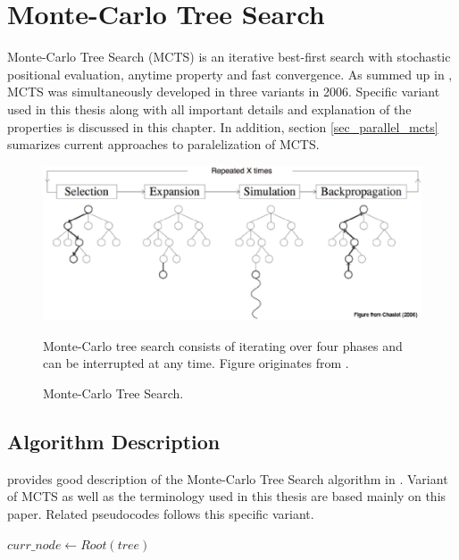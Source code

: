 \chapter{Monte-Carlo Tree Search}
\label{chap_mcts}

Monte-Carlo Tree Search (MCTS) is an iterative best-first search with stochastic positional
evaluation, anytime property and fast convergence. As \citeauthor{ChaslotPhd2010} summed up in 
\cite{ChaslotPhd2010}, MCTS was simultaneously developed
in three variants \cites{Chaslot2006}{Coulom2006}{Kocsis2006} in 2006. Specific variant used in
this thesis along with all important details and explanation of the properties is discussed in this
chapter. In addition, section \ref{sec_parallel_mcts} sumarizes current approaches to paralelization
of MCTS.

\begin{figure}
\begin{center}
\includegraphics[width=14cm]{img/mcts-algorithm-1a.eps}
\end{center}
\caption{\footnotesize Monte-Carlo Tree Search.}{\footnotesize Monte-Carlo tree search consists
of iterating over four phases and can be interrupted at any time. Figure originates from
\cite{ChaslotPhd2010}.}
\label{fig_mcts_loop}
\end{figure}



\section{Algorithm Description}
\label{sec_mcts_description}

\citeauthor{Chaslot2008} provides good description of the Monte-Carlo Tree Search algorithm in
\cite{Chaslot2008}. Variant of MCTS as well as the terminology used in this thesis are based mainly
on this paper. Related pseudocodes follows this specific variant.


\begin{algorithm}
\DontPrintSemicolon
\caption{$Select(tree)$     \label{alg_select}}
$curr\_node \leftarrow Root(tree)$\;
\;
\end{algorithm}


